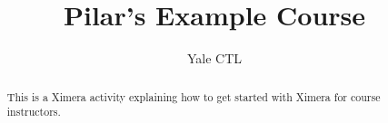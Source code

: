 \documentclass{xourse}
\title{Pilar's Example Course}
\author{Yale CTL}
\begin{document}
\pgfplotsset{compat=1.13}
\begin{abstract} %
This is a Ximera activity explaining how to get started with Ximera for course instructors.
\end{abstract}
\maketitle

\end{document}
